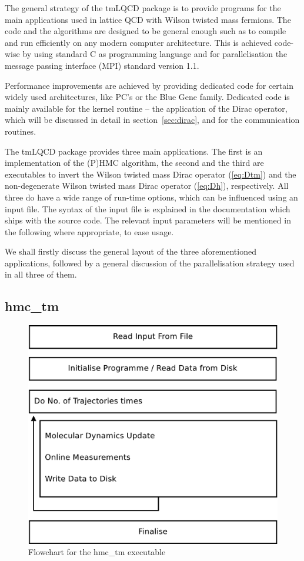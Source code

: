 The general strategy of the tmLQCD package is to provide programs for
the main applications used in lattice QCD with Wilson twisted mass
fermions. The code and the algorithms are designed to be general
enough such as to compile and run efficiently on any modern computer 
architecture. This is achieved code-wise by using standard C as
programming language and for parallelisation the message passing
interface (MPI) standard version 1.1.

Performance improvements are achieved by providing dedicated code for
certain widely used architectures, like PC's or the Blue Gene family. 
Dedicated code is mainly available for the kernel routine -- the
application of the Dirac operator, which will be discussed in
detail in section~\ref{sec:dirac}, and for the communication
routines.

The tmLQCD package provides three main applications. The first is an
implementation of the (P)HMC algorithm, the second and the third are
executables to invert the Wilson twisted mass Dirac operator
(\ref{eq:Dtm}) and the non-degenerate Wilson twisted mass Dirac operator
(\ref{eq:Dh}), respectively. All three do have a wide range of
run-time options, which can be influenced using an input file. The
syntax of the input file is explained in the documentation which ships
with the source code. The relevant input parameters will be mentioned
in the following where appropriate, to ease usage.

We shall firstly discuss the general layout of the three
aforementioned applications, followed by a general discussion of the
parallelisation strategy used in all three of them.

\subsection{{\ttfamily hmc\_tm}}

\begin{figure}[t]
  \centering
  \includegraphics[width=0.7\linewidth]{hmcflow}
  \caption{Flowchart for the {\ttfamily hmc\_tm} executable}
  \label{fig:hmcflow}
\end{figure}


